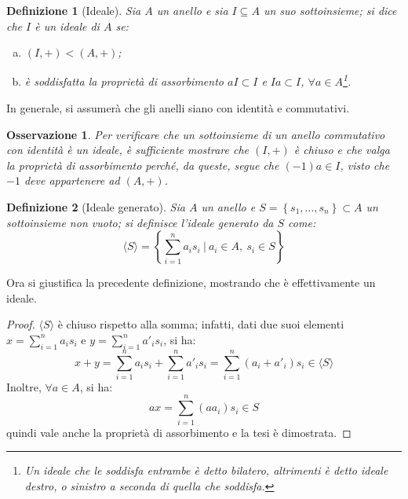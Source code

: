 \documentclass[11pt]{scrartcl}
\theoremstyle{style1}
\newtheorem{osservazione}{Osservazione}[section]
\newtheorem{definizione}{Definizione}[section]
\newenvironment{boxenv}[1][]{
    \begin{eqbox}[#1]
    }{
   \end{eqbox}
}
\numberwithin{equation}{subsection}
\begin{document}
\begin{definizione}
	[Ideale]
	Sia $A $ un anello e sia $I \subseteq A$ un suo sottoinsieme; si dice che $I$ \`e un ideale di $A$ se:
	\begin{enumerate}[(a).]
		\item $(I,+) < (A,+)$;
		\item \`e soddisfatta la propriet\`a di assorbimento $aI \subset I$ e $Ia \subset I$, $\forall a \in A$\footnote{Un ideale che le soddisfa entrambe \`e detto \textit{bilatero}, altrimenti \`e detto \textit{ideale destro}, o \textit{sinistro} a seconda di quella che soddisfa.}.
	\end{enumerate}
\end{definizione}
\begin{boxenv}[]
\centering	In generale, si assumer\`a che gli anelli siano con identit\`a e commutativi.
\end{boxenv}
\begin{osservazione}
Per verificare che un sottoinsieme di un anello commutativo con identit\`a \`e un ideale, \`e sufficiente mostrare che $(I,+)$ \`e chiuso e che valga la propriet\`a di assorbimento perch\'e, da queste, segue che $(-1)a \in I$, visto che $-1$ deve appartenere ad $(A,+)$.
\end{osservazione}
\begin{definizione}
	[Ideale generato]
	Sia $A$ un anello e $S=\left\{ s_1,\ldots,s_n \right\}  \subset A$ un sottoinsieme non vuoto; si definisce l'\textit{ideale generato} da $S$ come:
	\[
	\langle S \rangle= \left\{ \sum_{i=1}^{n} a_i s_i  \ \Bigg\lvert\ a_i \in A, \ s_i \in S \right\} 
	\] 
\end{definizione}
\noindent Ora si giustifica la precedente definizione, mostrando che \`e effettivamente un ideale.
\begin{proof}
	$\langle S \rangle$ \`e chiuso rispetto alla somma; infatti, dati due suoi elementi $x = \sum_{i=1}^{n} a_i s_i$ e $ y = \sum_{i=1}^{n} a'_i s_i$, si ha:
\[
x+y = \sum_{i=1}^{n} a_is_i + \sum_{i=1}^{n} a'_i s_i = \sum_{i=1}^{n} (a_i + a'_i) s_i \in \langle S \rangle
\] 
Inoltre, $\forall a \in A$, si ha:
\[
ax = \sum_{i=1}^{n}( a a_i) s_i \in S
\] 
quindi vale anche la propriet\`a di assorbimento e la tesi \`e dimostrata.
\end{proof}
\end{document}
